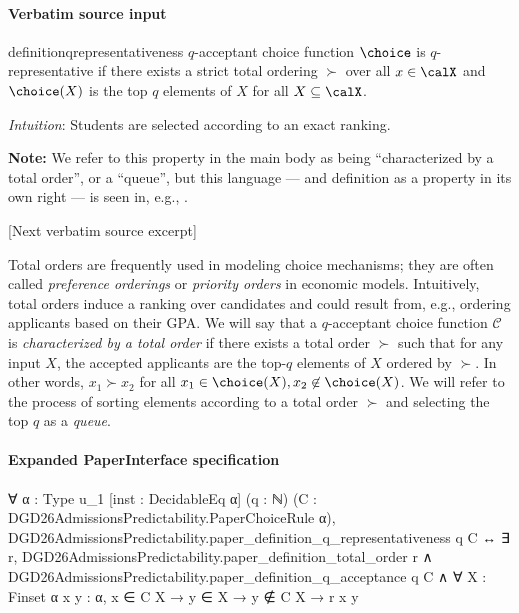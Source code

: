 \documentclass[10pt]{article}
\begin{document}
\paragraph{Verbatim source input}
\begin{ReviewVerbatim}
\begin{restatable}[$q$-representativeness]{definition}{qrepresentativeness}
\label{def:q-representative}
$q$-acceptant choice function $\choice$ is $q$-representative if there exists a strict total ordering $\succ$ over all $x \in \calX$ and $\choice(X)$ is the top $q$ elements of $X$ for all $X \subseteq \calX$.
\end{restatable}

\textit{Intuition}: Students are selected according to an exact ranking.

\textbf{Note:} We refer to this property in the main body as being ``characterized by a total order'', or a ``queue'', but this language --- and definition as a property in its own right --- is seen in, e.g., \citet{echenique2015control}.

[Next verbatim source excerpt]

Total orders are frequently used in modeling choice mechanisms; they are often called \textit{preference orderings} or \textit{priority orders} in economic models.
Intuitively, total orders induce a ranking over candidates and could result from, e.g., ordering applicants based on their GPA.
We will say that a $q$-acceptant choice function $\mathcal C$ is \textit{characterized by a total order} if there exists a total order $\succ$ such that for any input $X$, the accepted applicants are the top-$q$ elements of $X$ ordered by $\succ$.
In other words,  $x_1 \succ x_2$ for all $x_1 \in \choice(X), x_2 \not\in\choice(X)$.
We will refer to the process of sorting elements according to a total order $\succ$ and selecting the top $q$ as a \textit{queue}.
\end{ReviewVerbatim}


\paragraph{Expanded PaperInterface specification}
\begin{ReviewVerbatim}
∀ {α : Type u_1} [inst : DecidableEq α] (q : ℕ) (C : DGD26AdmissionsPredictability.PaperChoiceRule α),
  DGD26AdmissionsPredictability.paper_definition_q_representativeness q C ↔
    ∃ r,
      DGD26AdmissionsPredictability.paper_definition_total_order r ∧
        DGD26AdmissionsPredictability.paper_definition_q_acceptance q C ∧
          ∀ {X : Finset α} {x y : α}, x ∈ C X → y ∈ X → y ∉ C X → r x y
\end{ReviewVerbatim}
\end{document}
